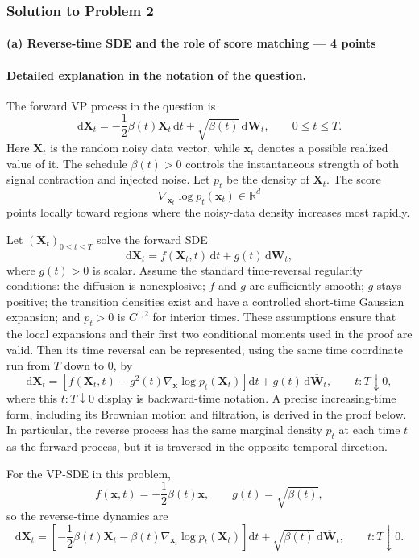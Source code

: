 \documentclass[11pt,a4paper]{article}
\theoremstyle{definition}
\begin{document}
\subsubsection{Solution to Problem 2}

\paragraph{(a) Reverse-time SDE and the role of score matching --- 4 points}

\paragraph{Detailed explanation in the notation of the question.}
The forward VP process in the question is
\[
\mathrm{d}\mathbf{X}_t
=-\frac12\beta(t)\mathbf{X}_t\,\mathrm{d}t
+\sqrt{\beta(t)}\,\mathrm{d}\mathbf{W}_t,
\qquad
0\leq t\leq T.
\]
Here $\mathbf{X}_t$ is the random noisy data vector, while $\mathbf{x}_t$ denotes a
possible realized value of it. The schedule $\beta(t)>0$ controls the instantaneous
strength of both signal contraction and injected noise. Let $p_t$ be the density of
$\mathbf{X}_t$. The score
\[
\nabla_{\mathbf{x}_t}\log p_t(\mathbf{x}_t)\in\mathbb{R}^d
\]
points locally toward regions where the noisy-data density increases most rapidly.

\begin{theorem}
Let $(\mathbf{X}_t)_{0\leq t\leq T}$ solve the forward SDE
\[
\mathrm{d}\mathbf{X}_t
=f(\mathbf{X}_t,t)\,\mathrm{d}t
+g(t)\,\mathrm{d}\mathbf{W}_t,
\]
where $g(t)>0$ is scalar. Assume the standard time-reversal regularity conditions: the
diffusion is nonexplosive; $f$ and $g$ are sufficiently smooth; $g$ stays positive; the
transition densities exist and have a controlled short-time Gaussian expansion; and
$p_t>0$ is $C^{1,2}$ for interior times. These assumptions ensure that the local
expansions and their first two conditional moments used in the proof are valid. Then its
time reversal can be represented, using the same time coordinate run from $T$ down to $0$,
by
\[
\mathrm{d}\mathbf{X}_t
=\left[
f(\mathbf{X}_t,t)
-g^2(t)\nabla_{\mathbf{x}}\log p_t(\mathbf{X}_t)
\right]\mathrm{d}t
+g(t)\,\mathrm{d}\overline{\mathbf{W}}_t,
\qquad
t:T\downarrow0,
\]
where this $t:T\downarrow0$ display is backward-time notation. A precise increasing-time
form, including its Brownian motion and filtration, is derived in the proof below. In
particular, the reverse process has the same marginal density $p_t$ at each time $t$ as
the forward process, but it is traversed in the opposite temporal direction.

For the VP-SDE in this problem,
\[
f(\mathbf{x},t)=-\frac12\beta(t)\mathbf{x},
\qquad
g(t)=\sqrt{\beta(t)},
\]
so the reverse-time dynamics are
\[
\mathrm{d}\mathbf{X}_t
=\left[
-\frac12\beta(t)\mathbf{X}_t
-\beta(t)\nabla_{\mathbf{x}_t}\log p_t(\mathbf{X}_t)
\right]\mathrm{d}t
+\sqrt{\beta(t)}\,\mathrm{d}\overline{\mathbf{W}}_t,
\qquad
t:T\downarrow0.
\]
\end{theorem}
\end{document}
